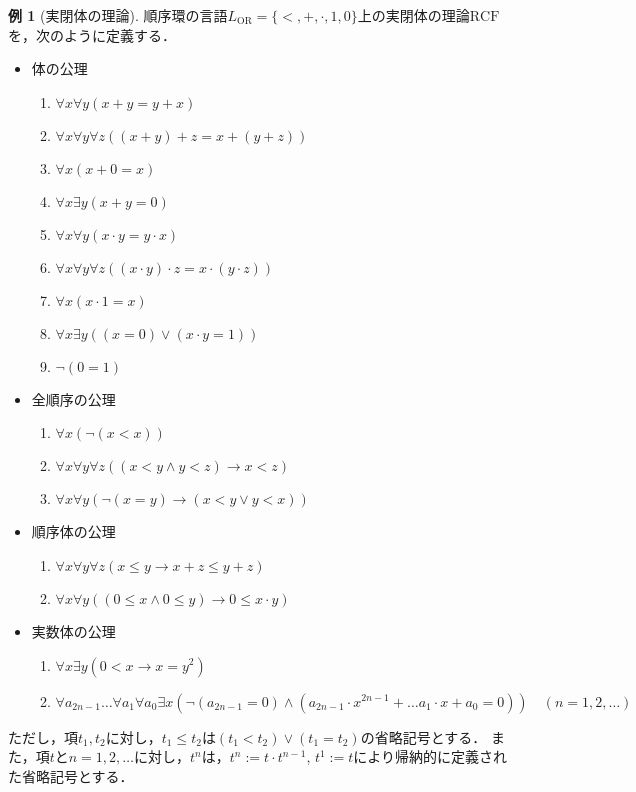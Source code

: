 \documentclass[uplatex, dvipdfmx]{jsarticle}
\newcommand{\RCF}{\mathrm{RCF}}
\theoremstyle{definition}
\newtheorem{example}{例}[section]
\begin{document}
\begin{example}[実閉体の理論]
     順序環の言語$L_\mathrm{OR}=\{<, +, \cdot, 1, 0\}$上の実閉体の理論$\RCF$を，次のように定義する．
     
     \begin{itemize}
          \item 体の公理
          \begin{enumerate}
               \item $\forall x \forall y(x + y = y + x)$
               \item $\forall x \forall y \forall z((x + y) + z = x + (y + z))$
               \item $\forall x (x + 0 = x)$
               \item $\forall x \exists y (x + y = 0)$
               \item $\forall x \forall y(x \cdot y = y \cdot x)$
               \item $\forall x \forall y \forall z((x \cdot y) \cdot z = x \cdot (y \cdot z))$
               \item $\forall x (x \cdot 1 = x)$
               \item $\forall x \exists y ((x=0) \lor (x \cdot y = 1))$
               \item $\lnot(0 = 1)$
          \end{enumerate}
          \item 全順序の公理
          \begin{enumerate}
               \item $\forall x (\lnot(x<x))$
               \item $\forall x \forall y \forall z((x < y \land y < z) \rightarrow x < z)$
               \item $\forall x \forall y (\lnot(x = y) \rightarrow (x<y \lor y<x))$
          \end{enumerate}
          \item 順序体の公理
          \begin{enumerate}
               \item $\forall x \forall y \forall z (x \leq y \rightarrow x + z \leq y + z)$
               \item $\forall x \forall y ((0 \leq x \land 0 \leq y) \rightarrow 0 \leq x \cdot y )$
          \end{enumerate}
          \item 実数体の公理
          \begin{enumerate}
               \item $\forall x \exists y (0<x \rightarrow x=y^2)$
               \item $\forall a_{2n-1} \dots \forall a_1 \forall a_0 \exists x(\lnot(a_{2n-1} = 0) \land (a_{2n-1}\cdot x^{2n-1} + \dots a_1 \cdot x + a_0 = 0)) \quad (n=1,2,\dots)$ 
          \end{enumerate}
     \end{itemize}

     ただし，項$t_1, t_2$に対し，$t_1 \leq t_2$は$(t_1 < t_2)\lor(t_1 = t_2)$の省略記号とする．
     また，項$t$と$n=1,2,\dots$に対し，$t^n$は，$t^n:=t \cdot t^{n-1}$, $t^1:=t$により帰納的に定義された省略記号とする．
\end{example}
\end{document}
